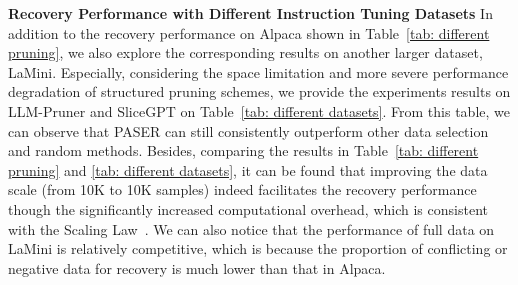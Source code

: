 \textbf{Recovery Performance with Different Instruction Tuning Datasets}
In addition to the recovery performance on Alpaca shown in Table~\ref{tab: different pruning}, we also explore the corresponding results on another larger dataset, LaMini. Especially, considering the space limitation and more severe performance degradation of structured pruning schemes, we provide the experiments results on LLM-Pruner and SliceGPT on Table~\ref{tab: different datasets}. From this table, we can observe that PASER can still consistently outperform other data selection and random methods. Besides, comparing the results in Table~\ref{tab: different pruning} and \ref{tab: different datasets}, it can be found that improving the data scale (from 10K to 10K samples) indeed facilitates the recovery performance though the significantly increased computational overhead, which is consistent with the Scaling Law~\citep{kaplan2020scaling}. We can also notice that the performance of full data on LaMini is relatively competitive, which is because the proportion of conflicting or negative data for recovery is much lower than that in Alpaca. 


\begin{table*}[h]
\caption{Ablation study results on LLaMA2-7B for each component under different pruning schemes. The ``Reason'' indicates the averaged performance on 7 common sense reasoning datasets.}
\label{tab:ablation}
\centering
{}
\end{table*}

